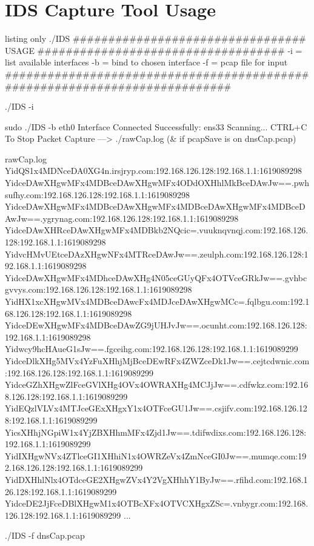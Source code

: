 \section{IDS Capture Tool Usage}

\begin{tcblisting}{listing only}
./IDS
################################# USAGE ###################################
-i = list available interfaces
-b = bind to chosen interface
-f = pcap file for input
###########################################################################

./IDS -i


sudo ./IDS -b eth0
Interface Connected Successfully: ens33
Scanning... CTRL+C To Stop Packet Capture 
---> ./rawCap.log   (\& if pcapSave is on dnsCap.pcap)

rawCap.log
    YidQS1x4MDNceDA0XG4n.irsjryp.com:192.168.126.128:192.168.1.1:1619089298
    YidceDAwXHgwMFx4MDBceDAwXHgwMFx4ODdOXHhlMkBceDAwJw==.pwhsufhy.com:192.168.126.128:192.168.1.1:1619089298
    YidceDAwXHgwMFx4MDBceDAwXHgwMFx4MDBceDAwXHgwMFx4MDBceDAwJw==.ygrynag.com:192.168.126.128:192.168.1.1:1619089298
    YidceDAwXHRceDAwXHgwMFx4MDBkb2NQcic=.vuuknqvnqj.com:192.168.126.128:192.168.1.1:1619089298
    YidvcHMvUEtceDAzXHgwNFx4MTRceDAwJw==.zeulph.com:192.168.126.128:192.168.1.1:1619089298
    YidceDAwXHgwMFx4MDhceDAwXHg4N05ceGUyQFx4OTVceGRkJw==.gvhbcgvvys.com:192.168.126.128:192.168.1.1:1619089298
    YidHX1xcXHgwMVx4MDBceDAwcFx4MDJceDAwXHgwMCc=.fqlbgu.com:192.168.126.128:192.168.1.1:1619089298
    YidceDEwXHgwMFx4MDBceDAwZG9jUHJvJw==.ocunht.com:192.168.126.128:192.168.1.1:1619089298
    Yidwcy9hcHAueG1sJw==.fgceihg.com:192.168.126.128:192.168.1.1:1619089299
    YidceDlkXHg5MVx4YzFuXHhjMjBceDEwRFx4ZWZceDk1Jw==.cejtcdwnic.com:192.168.126.128:192.168.1.1:1619089299
    YidceGZhXHgwZlFceGVlXHg4OVx4OWRAXHg4MCJjJw==.cdfwkz.com:192.168.126.128:192.168.1.1:1619089299
    YidEQzlVLVx4MTJceGExXHgxY1x4OTFceGU1Jw==.csjifv.com:192.168.126.128:192.168.1.1:1619089299
    YicsXHhjNGpiW1x4YjZBXHhmMFx4Zjd1Jw==.tdifwdixs.com:192.168.126.128:192.168.1.1:1619089299
    YidIXHgwNVx4ZTlceGI1XHhiN1x4OWRZeVx4ZmNceGI0Jw==.mumqe.com:192.168.126.128:192.168.1.1:1619089299
    YidDXHhlNlx4OTdceGE2XHgwZVx4Y2VgXHhhY1ByJw==.rfihd.com:192.168.126.128:192.168.1.1:1619089299
    YidceDE2JjFceDBlXHgwM1x4OTBcXFx4OTVCXHgxZSc=.vnbygr.com:192.168.126.128:192.168.1.1:1619089299
    ...


./IDS -f dnsCap.pcap
\end{tcblisting}


